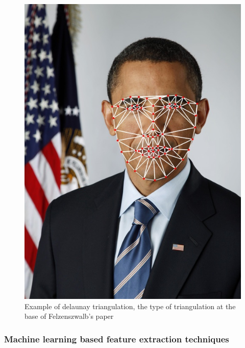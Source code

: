 \documentclass[conference]{IEEEtran}
\begin{document}
					\begin{figure}[!ht]
						\centerline{\includegraphics[height=0.4\textheight]{imgs/delaunay.jpg}}
						\caption{Example of delaunay triangulation, the type of triangulation at the base of Felzenszwalb's paper}
						\label{fig:3}
					\end{figure}
					
				\subsubsection{Machine learning based feature extraction techniques} \label{mlfe}
					
\end{document}
